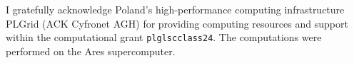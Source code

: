 


I gratefully acknowledge Poland's high-performance computing infrastructure PLGrid (ACK Cyfronet AGH) for providing computing resources and support within the computational grant \texttt{plglscclass24}.
The computations were performed on the Ares supercomputer.

\MediaOptionLogicBlank